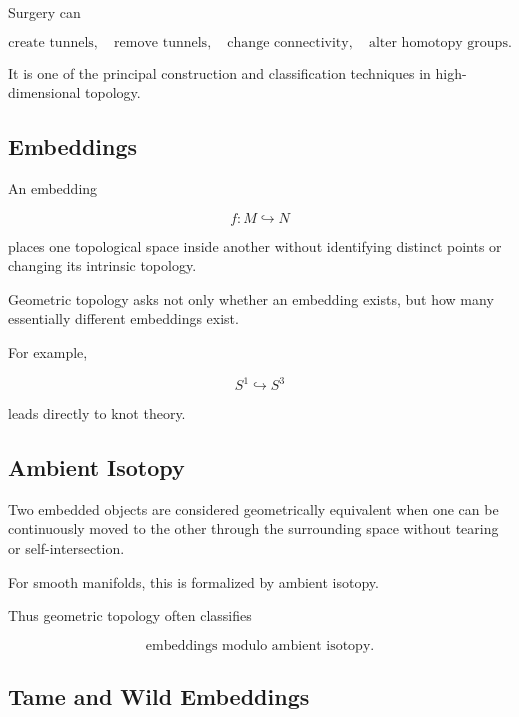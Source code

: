 Surgery can

\[
\boxed{
\text{create tunnels},
\quad
\text{remove tunnels},
\quad
\text{change connectivity},
\quad
\text{alter homotopy groups}.
}
\]

It is one of the principal construction and classification techniques in
high-dimensional topology.

\subsection{Embeddings}
\label{subsec:geometric-topology-embeddings}

An embedding

\[
f:M\hookrightarrow N
\]

places one topological space inside another without identifying distinct
points or changing its intrinsic topology.

Geometric topology asks not only whether an embedding exists, but how many
essentially different embeddings exist.

For example,

\[
\boxed{
S^1\hookrightarrow S^3
}
\]

leads directly to knot theory.

\subsection{Ambient Isotopy}
\label{subsec:geometric-topology-ambient-isotopy}

Two embedded objects are considered geometrically equivalent when one can
be continuously moved to the other through the surrounding space without
tearing or self-intersection.

For smooth manifolds, this is formalized by ambient isotopy.

Thus geometric topology often classifies

\[
\boxed{
\text{embeddings modulo ambient isotopy}.
}
\]

\subsection{Tame and Wild Embeddings}
\label{subsec:tame-wild-embeddings}

